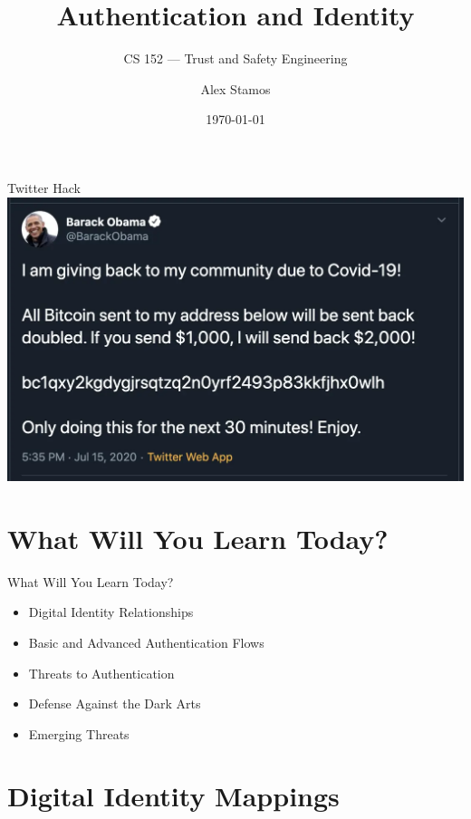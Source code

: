 \documentclass[nobackground,dvipsnames,table]{beamer}
\title{Authentication and Identity}
\subtitle{CS 152 --- Trust and Safety Engineering}
\author[A. Stamos]{Alex Stamos}
\institute[Stanford University]{Stanford Cyber Policy Center}
\date[2022]{\today}
\begin{document}
\begin{frame}
    \titlepage
\end{frame}

\begin{frame}{Twitter Hack}
    \includegraphics[width=\textwidth]{thanks-obama}
\end{frame}


\section{What Will You Learn Today?}

\begin{frame}{What Will You Learn Today?}
    \Large
    \begin{itemize}
        \item Digital Identity Relationships
        \item Basic and Advanced Authentication Flows
        \item Threats to Authentication
        \item Defense Against the Dark Arts
        \item Emerging Threats
    \end{itemize}
\end{frame}

\section{Digital Identity Mappings}
\end{document}
